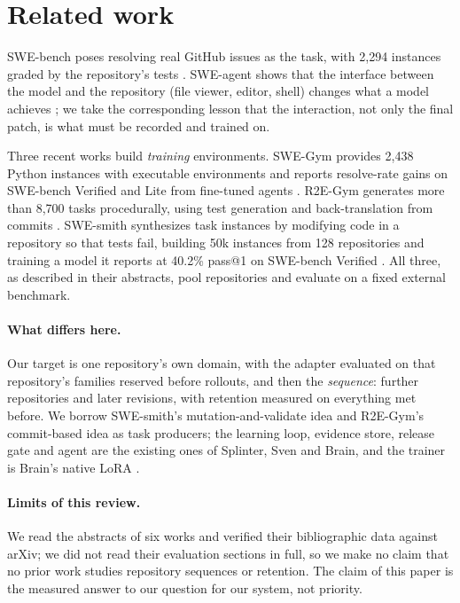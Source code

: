 
\section{Related work}

SWE-bench poses resolving real GitHub issues as the task, with 2{,}294 instances graded
by the repository's tests \citep{jimenez2024swebench}. SWE-agent shows that the
interface between the model and the repository (file viewer, editor, shell) changes
what a model achieves \citep{yang2024sweagent}; we take the corresponding lesson that the
interaction, not only the final patch, is what must be recorded and trained on.

Three recent works build \emph{training} environments. SWE-Gym provides 2{,}438 Python
instances with executable environments and reports resolve-rate gains on SWE-bench
Verified and Lite from fine-tuned agents \citep{pan2025swegym}. R2E-Gym generates more than
8{,}700 tasks procedurally, using test generation and back-translation from commits
\citep{jain2025r2egym}. SWE-smith synthesizes task instances by modifying code in
a repository so that tests fail, building 50k instances from 128 repositories and
training a model it reports at 40.2\% pass@1 on SWE-bench Verified \citep{yang2025swesmith}.
All three, as described in their abstracts, pool repositories and evaluate on a fixed
external benchmark.

\paragraph{What differs here.} Our target is one repository's own domain, with the
adapter evaluated on that repository's families reserved before rollouts, and then
the \emph{sequence}: further repositories and later revisions, with retention measured on
everything met before. We borrow SWE-smith's mutation-and-validate idea and R2E-Gym's
commit-based idea as task producers; the learning loop, evidence store, release gate and
agent are the existing ones of Splinter, Sven and Brain, and the trainer is Brain's native
LoRA \citep{hu2021lora}.

\paragraph{Limits of this review.} We read the abstracts of six works and verified
their bibliographic data against arXiv; we did not read their evaluation sections in
full, so we make no claim that no prior work studies repository sequences or retention.
The claim of this paper is the measured answer to our question for our system, not
priority.
